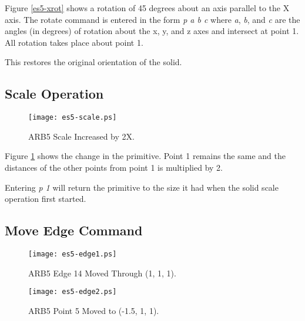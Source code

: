 
Figure \ref{es5-xrot} shows a rotation of 45 degrees
about an axis parallel to the X axis.
The rotate command is entered in the form {\em p a b c}
where {\em a}, {\em b}, and {\em c} are the angles
(in degrees) of rotation about the x, y, and z axes and intersect at point 1.
All rotation takes place about point 1.


This restores the original orientation of the solid.

\subsection{Scale Operation}

\begin{figure}
\centering \texttt{[image: es5-scale.ps]}
\caption{ARB5 Scale Increased by 2X.}
\label{es5-scale}
\end{figure}


Figure \ref{es5-scale} shows the change in the primitive.
Point 1 remains the same
and the distances of the other points from point 1 is multiplied by 2.

Entering {\em p 1} will return the primitive
to the size it had when the solid scale operation first started.


\subsection{Move Edge Command}

\begin{figure}
\centering \texttt{[image: es5-edge1.ps]}
\caption{ARB5 Edge 14 Moved Through (1, 1, 1).}
\label{es5-edge1}
\end{figure}

\begin{figure}
\centering \texttt{[image: es5-edge2.ps]}
\caption{ARB5 Point 5 Moved to (-1.5, 1, 1).}
\label{es5-edge2}
\end{figure}

